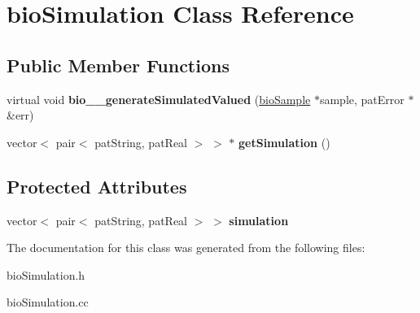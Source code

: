\hypertarget{classbio_simulation}{}\section{bio\+Simulation Class Reference}
\label{classbio_simulation}
\subsection*{Public Member Functions}
\begin{DoxyCompactItemize}
\item 
\mbox{\label{classbio_simulation_ae53e55d6e8df025cb7d6f865913bc9bf}} 
virtual void {\bfseries bio\+\_\+\+\_\+generate\+Simulated\+Valued} (\hyperlink{classbio_sample}{bio\+Sample} $\ast$sample, pat\+Error $\ast$\&err)
\item 
\mbox{\label{classbio_simulation_a9db3e05c7fdcb93f07e1bf0e8b709541}} 
vector$<$ pair$<$ pat\+String, pat\+Real $>$ $>$ $\ast$ {\bfseries get\+Simulation} ()
\end{DoxyCompactItemize}
\subsection*{Protected Attributes}
\begin{DoxyCompactItemize}
\item 
\mbox{\label{classbio_simulation_a52eec972dd8e235dd2476d0c5eb15d95}} 
vector$<$ pair$<$ pat\+String, pat\+Real $>$ $>$ {\bfseries simulation}
\end{DoxyCompactItemize}


The documentation for this class was generated from the following files\+:\begin{DoxyCompactItemize}
\item 
bio\+Simulation.\+h\item 
bio\+Simulation.\+cc\end{DoxyCompactItemize}
